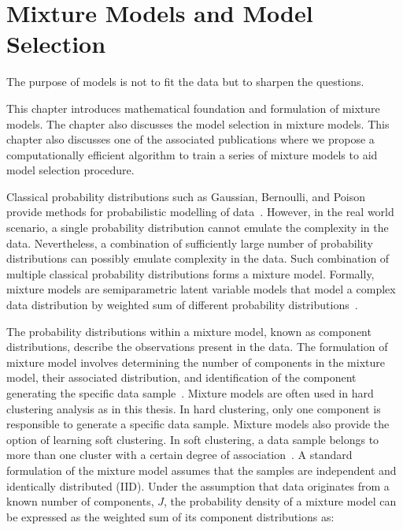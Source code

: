 \chapter[Mixture Models and Model Selection]{Mixture Models and Model Selection}
\label{ch:mixmodels}

\begin{fquote}The purpose of models is not to fit the data but to 
sharpen the questions. 
\end{fquote} 

\begin{synopsis}
This chapter introduces mathematical foundation and 
formulation of mixture models. The chapter also discusses the
model selection in mixture models.
This chapter also discusses one of the associated publications
where we propose a computationally efficient algorithm to train
a series of mixture models to aid model selection procedure.
\end{synopsis}

Classical probability distributions such as Gaussian, Bernoulli, and 
Poison provide methods for probabilistic modelling 
of data~\cite{walpole2012}. However, in the real world scenario, 
a single probability distribution cannot emulate the complexity 
in the data. Nevertheless, a combination of sufficiently large number 
of probability distributions can possibly emulate complexity in the data. 
Such combination of multiple classical probability distributions 
forms a mixture model. Formally, mixture models are semiparametric 
latent variable models that model a complex data distribution by
weighted sum of different probability 
distributions~\cite{bishop06,everittmixdist,mclachlanfmm}. 

The probability distributions within a mixture model, known as 
component distributions, describe the observations present in the 
data. The formulation of mixture model involves determining the 
number of components in the mixture model, their associated 
distribution, and identification of the component
generating the specific data sample~\cite{mclachlanfmm}. 
Mixture models are often used  in hard clustering analysis as in 
this thesis. In hard clustering, only one component is responsible 
to generate a  specific data sample. Mixture models also provide 
the option of learning soft clustering.  In soft clustering, 
a data sample belongs to more than 
one cluster with a certain degree of association~\cite{bishop06}. 
A standard formulation of the mixture model assumes that the samples 
are independent and identically distributed (IID). Under the assumption 
that data originates from a known number of components, $J$, the 
probability density of a mixture model can be expressed as the weighted
sum of its component distributions as:

